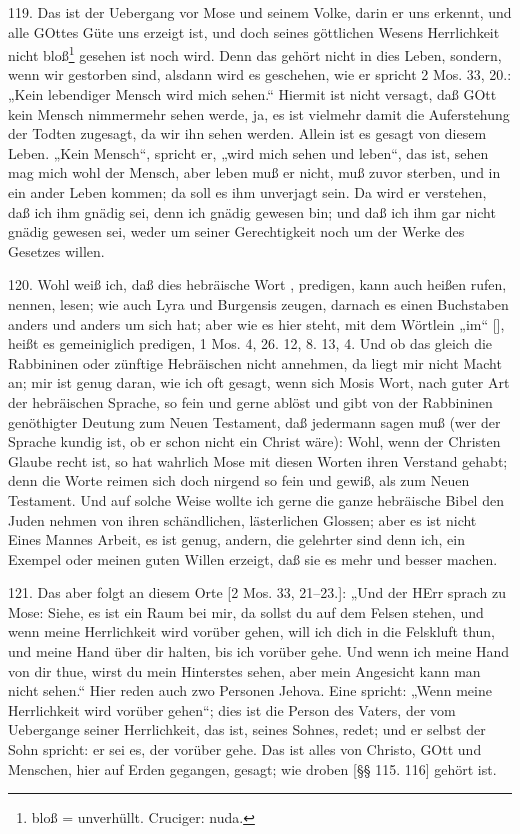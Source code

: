 119. Das ist der Uebergang vor Mose und seinem Volke, darin er uns erkennt, und alle GOttes Güte uns erzeigt ist, und doch seines göttlichen Wesens Herrlichkeit nicht bloß\footnote{bloß = unverhüllt. Cruciger: nuda.} gesehen ist noch wird. Denn das gehört nicht in dies Leben, sondern, wenn wir gestorben sind, alsdann wird es geschehen, wie er spricht 2 Mos. 33, 20.: „Kein lebendiger Mensch wird mich sehen.“ Hiermit ist nicht versagt, daß GOtt kein Mensch nimmermehr sehen werde, ja, es ist vielmehr damit die Auferstehung der Todten zugesagt, da wir ihn sehen werden. Allein ist es gesagt von diesem Leben. „Kein Mensch“, spricht er, „wird mich sehen und leben“, das ist, sehen mag mich wohl der Mensch, aber leben muß er nicht, muß zuvor sterben, und in ein ander Leben kommen; da soll es ihm unverjagt sein. Da wird er verstehen, daß ich ihm gnädig sei, denn ich gnädig gewesen bin; und daß ich ihm gar nicht gnädig gewesen sei, weder um seiner Gerechtigkeit noch um der Werke des Gesetzes willen.

120. Wohl weiß ich, daß dies hebräische Wort , predigen, kann auch heißen rufen, nennen, lesen; wie auch Lyra und Burgensis zeugen, darnach es einen Buchstaben anders und anders um sich hat; aber wie es hier steht, mit dem Wörtlein „im“ [], heißt es gemeiniglich predigen, 1 Mos. 4, 26. 12, 8. 13, 4. Und ob das gleich die Rabbininen oder zünftige Hebräischen nicht annehmen, da liegt mir nicht Macht an; mir ist genug daran, wie ich oft gesagt, wenn sich Mosis Wort, nach guter Art der hebräischen Sprache, so fein und gerne ablöst und gibt von der Rabbininen genöthigter Deutung zum Neuen Testament, daß jedermann sagen muß (wer der Sprache kundig ist, ob er schon nicht ein Christ wäre): Wohl, wenn der Christen Glaube recht ist, so hat wahrlich Mose mit diesen Worten ihren Verstand gehabt; denn die Worte reimen sich doch nirgend so fein und gewiß, als zum Neuen Testament. Und auf solche Weise wollte ich gerne die ganze hebräische Bibel den Juden nehmen von ihren schändlichen, lästerlichen Glossen; aber es ist nicht Eines Mannes Arbeit, es ist genug, andern, die gelehrter sind denn ich, ein Exempel oder meinen guten Willen erzeigt, daß sie es mehr und besser machen.

121. Das aber folgt an diesem Orte [2 Mos. 33, 21–23.]: „Und der HErr sprach zu Mose: Siehe, es ist ein Raum bei mir, da sollst du auf dem Felsen stehen, und wenn meine Herrlichkeit wird vorüber gehen, will ich dich in die Felskluft thun, und meine Hand über dir halten, bis ich vorüber gehe. Und wenn ich meine Hand von dir thue, wirst du mein Hinterstes sehen, aber mein Angesicht kann man nicht sehen.“ Hier reden auch zwo Personen Jehova. Eine spricht: „Wenn meine Herrlichkeit wird vorüber gehen“; dies ist die Person des Vaters, der vom Uebergange seiner Herrlichkeit, das ist, seines Sohnes, redet; und er selbst der Sohn spricht: er sei es, der vorüber gehe. Das ist alles von Christo, GOtt und Menschen, hier auf Erden gegangen, gesagt; wie droben [§§ 115. 116] gehört ist.

